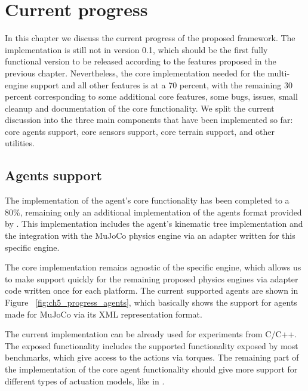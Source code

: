 
\chapter{Current progress}
\label{ch:current_progress}



In this chapter we discuss the current progress of the proposed framework. The implementation
is still not in version 0.1, which should be the first fully functional version to be released
according to the features proposed in the previous chapter. Nevertheless, the core implementation
needed for the multi-engine support and all other features is at a 70 percent, 
with the remaining
30 percent corresponding to some additional core features, some bugs, issues, small cleanup and 
documentation of the core functionality. We split the current discussion into the three main 
components that have been implemented so far: core agents support, core sensors support, core 
terrain support, and other utilities.

\section{Agents support}

The implementation of the agent's core functionality has been completed to a 80\%,
remaining only an additional implementation of the agents format provided by \cite{TerrainRLSim}.
This implementation includes the agent's kinematic tree implementation and the integration 
with the MuJoCo physics engine via an adapter written for this specific engine.

The core implementation remains agnostic of the specific engine, which allows us
to make support quickly for the remaining proposed physics engines via adapter code
written once for each platform. The current supported agents are shown in Figure ~\ref{fig:ch5_progress_agents},
which basically shows the support for agents made for MuJoCo via its XML representation format.

The current implementation can be already used for experiments from C/C++. The exposed
functionality includes the supported functionality exposed by most benchmarks, which
give access to the actions via torques. The remaining part of the implementation of the core
agent functionality should give more support for different types of actuation models, like in \cite{ActuationChoice}.

